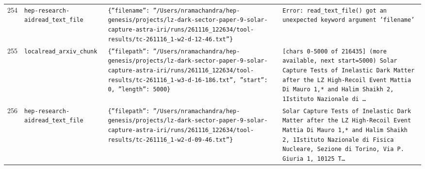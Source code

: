\documentclass[11pt,a4paper]{article}
\begin{document}
\begin{longtable}{@{}p{}p{}p{}p{}@{}}
254 & \texttt{hep-research-aid}\newline\texttt{read\_\allowbreak{}text\_\allowbreak{}file} & \texttt{\{''filename'':\allowbreak{} ''/\allowbreak{}Users/\allowbreak{}nramachandra/\allowbreak{}hep-genesis/\allowbreak{}projects/\allowbreak{}lz-dark-sector-paper-9-solar-capture-astra-iri/\allowbreak{}runs/\allowbreak{}261116\_\allowbreak{}122634/\allowbreak{}tool-results/\allowbreak{}tc-261116\_\allowbreak{}1-w2-d-12-46.txt''\}\allowbreak{}} & \texttt{Error:\allowbreak{} read\_\allowbreak{}text\_\allowbreak{}file()\allowbreak{} got an unexpected keyword argument 'filename'} \\
255 & \texttt{local}\newline\texttt{read\_\allowbreak{}arxiv\_\allowbreak{}chunk} & \texttt{\{''filepath'':\allowbreak{} ''/\allowbreak{}Users/\allowbreak{}nramachandra/\allowbreak{}hep-genesis/\allowbreak{}projects/\allowbreak{}lz-dark-sector-paper-9-solar-capture-astra-iri/\allowbreak{}runs/\allowbreak{}261116\_\allowbreak{}122634/\allowbreak{}tool-results/\allowbreak{}tc-261116\_\allowbreak{}1-w3-d-16-186.txt'',\allowbreak{} ''start'':\allowbreak{} 0,\allowbreak{} ''length'':\allowbreak{} 5000\}\allowbreak{}} & \texttt{[chars 0-5000 of 216435]\allowbreak{} (more available,\allowbreak{} next start=\allowbreak{}5000)\allowbreak{}  Solar Capture Tests of Inelastic Dark Matter after the LZ High-Recoil Event Mattia Di Mauro 1,\allowbreak{}* and Halim Shaikh 2,\allowbreak{}\dag{}\allowbreak{} 1Istituto Nazionale di \ldots{}\allowbreak{}} \\
256 & \texttt{hep-research-aid}\newline\texttt{read\_\allowbreak{}text\_\allowbreak{}file} & \texttt{\{''filepath'':\allowbreak{} ''/\allowbreak{}Users/\allowbreak{}nramachandra/\allowbreak{}hep-genesis/\allowbreak{}projects/\allowbreak{}lz-dark-sector-paper-9-solar-capture-astra-iri/\allowbreak{}runs/\allowbreak{}261116\_\allowbreak{}122634/\allowbreak{}tool-results/\allowbreak{}tc-261116\_\allowbreak{}1-w2-d-09-46.txt''\}\allowbreak{}} & \texttt{Solar Capture Tests of Inelastic Dark Matter after the LZ High-Recoil Event Mattia Di Mauro 1,\allowbreak{}* and Halim Shaikh 2,\allowbreak{}\dag{}\allowbreak{} 1Istituto Nazionale di Fisica Nucleare,\allowbreak{} Sezione di Torino,\allowbreak{} Via P. Giuria 1,\allowbreak{} 10125 T\ldots{}\allowbreak{}} \\

\end{longtable}
\end{document}
